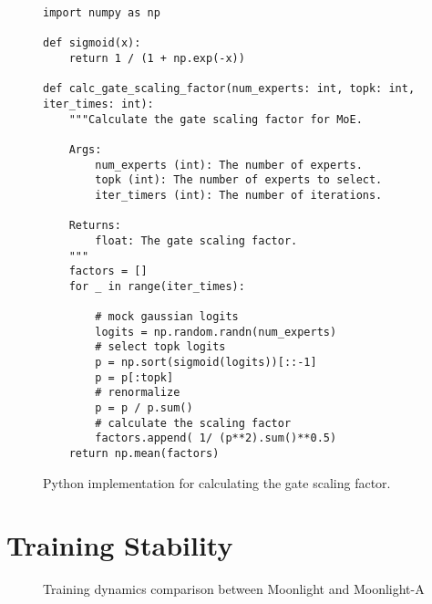 \begin{figure}[h]
\begin{lstlisting}[frame=single,breaklines=false]
import numpy as np

def sigmoid(x):
    return 1 / (1 + np.exp(-x))

def calc_gate_scaling_factor(num_experts: int, topk: int, iter_times: int):
    """Calculate the gate scaling factor for MoE.

    Args:
        num_experts (int): The number of experts.
        topk (int): The number of experts to select.
        iter_timers (int): The number of iterations.

    Returns:
        float: The gate scaling factor.
    """
    factors = []
    for _ in range(iter_times):

        # mock gaussian logits
        logits = np.random.randn(num_experts)
        # select topk logits
        p = np.sort(sigmoid(logits))[::-1]
        p = p[:topk]
        # renormalize
        p = p / p.sum()
        # calculate the scaling factor
        factors.append( 1/ (p**2).sum()**0.5)
    return np.mean(factors)
\end{lstlisting}
\caption{Python implementation for calculating the gate scaling factor.}
\label{fig:gate_scaling_code}
\end{figure}

\section{Training Stability}
\label{sec:appendix:stability}

\begin{figure}[htbp]
    \centering
    
    \vspace{0.5em}
    
    
    \caption{Training dynamics comparison between Moonlight and Moonlight-A}
    \label{fig:training_dynamics}
\end{figure}

